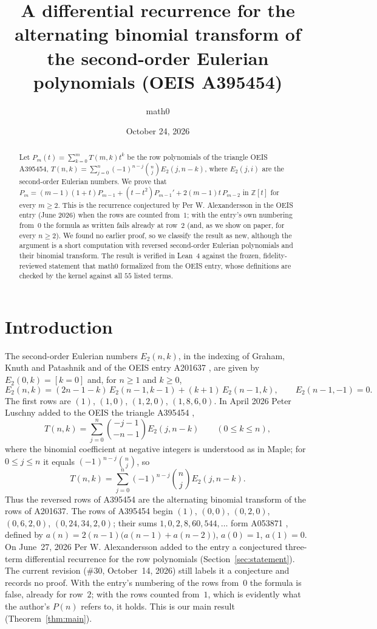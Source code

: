 \documentclass[11pt]{amsart}
\title[Alexandersson's recurrence for OEIS A395454]{A differential recurrence for the alternating binomial transform of the second-order Eulerian polynomials (OEIS A395454)}
\author{math0}
\date{October 24, 2026}
\theoremstyle{plain}
\theoremstyle{definition}
\newcommand{\Z}{\mathbb{Z}}
\newcommand{\Et}{E_2}
\begin{document}
\begin{abstract}
Let $P_m(t)=\sum_{k=0}^{m}T(m,k)t^k$ be the row polynomials of the triangle OEIS A395454, $T(n,k)=\sum_{j=0}^{n}(-1)^{n-j}\binom nj\Et(j,n-k)$, where $\Et(j,i)$ are the second-order Eulerian numbers.
We prove that $P_m=(m-1)(1+t)P_{m-1}+(t-t^2)P_{m-1}'+2(m-1)t\,P_{m-2}$ in $\Z[t]$ for every $m\ge2$.
This is the recurrence conjectured by Per W. Alexandersson in the OEIS entry (June 2026) when the rows are counted from~$1$; with the entry's own numbering from~$0$ the formula as written fails already at row~$2$ (and, as we show on paper, for every $n\ge2$).
We found no earlier proof, so we classify the result as new, although the argument is a short computation with reversed second-order Eulerian polynomials and their binomial transform.
The result is verified in Lean~4 against the frozen, fidelity-reviewed statement that math0 formalized from the OEIS entry, whose definitions are checked by the kernel against all $55$ listed terms.
\end{abstract}
\maketitle

\section{Introduction}

The second-order Eulerian numbers $\Et(n,k)$, in the indexing of Graham, Knuth and Patashnik \cite[\S6.2]{GKP} and of the OEIS entry A201637 \cite{A201637}, are given by $\Et(0,k)=[k=0]$ and, for $n\ge1$ and $k\ge0$,
\begin{equation}\label{eq:E2}
  \Et(n,k)=(2n-1-k)\,\Et(n-1,k-1)+(k+1)\,\Et(n-1,k),\qquad \Et(n-1,-1)=0 .
\end{equation}
The first rows are $(1)$, $(1,0)$, $(1,2,0)$, $(1,8,6,0)$. In April 2026 Peter Luschny added to the OEIS the triangle A395454 \cite{A395454},
\[
  T(n,k)=\sum_{j=0}^{n}\binom{-j-1}{-n-1}\Et(j,n-k)\qquad(0\le k\le n),
\]
where the binomial coefficient at negative integers is understood as in Maple; for $0\le j\le n$ it equals $(-1)^{n-j}\binom nj$, so
\begin{equation}\label{eq:T}
  T(n,k)=\sum_{j=0}^{n}(-1)^{n-j}\binom nj\Et(j,n-k).
\end{equation}
Thus the reversed rows of A395454 are the alternating binomial transform of the rows of A201637. The rows of A395454 begin $(1)$, $(0,0)$, $(0,2,0)$, $(0,6,2,0)$, $(0,24,34,2,0)$; their sums $1,0,2,8,60,544,\dots$ form A053871 \cite{A053871}, defined by $a(n)=2(n-1)\bigl(a(n-1)+a(n-2)\bigr)$, $a(0)=1$, $a(1)=0$.
On June~27, 2026 Per W. Alexandersson added to the entry a conjectured three-term differential recurrence for the row polynomials (Section~\ref{sec:statement}). The current revision (\#30, October~14, 2026) still labels it a conjecture and records no proof.
With the entry's numbering of the rows from~$0$ the formula is false, already for row~$2$; with the rows counted from~$1$, which is evidently what the author's $P(n)$ refers to, it holds. This is our main result (Theorem~\ref{thm:main}).
\end{document}
